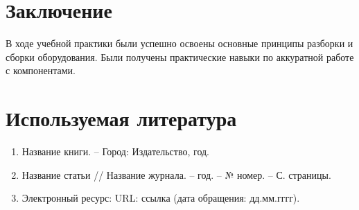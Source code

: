 \documentclass[a4paper,14pt]{article}
\begin{document}
\section{Заключение}

В ходе учебной практики были успешно освоены основные принципы разборки и сборки оборудования. Были получены практические навыки по аккуратной работе с компонентами.

\section{Используемая литература}

\begin{enumerate}
\item Название книги. – Город: Издательство, год.
\item Название статьи // Название журнала. – год. – № номер. – С. страницы.
\item Электронный ресурс: URL: ссылка (дата обращения: дд.мм.гггг).
\end{enumerate}
\end{document}
